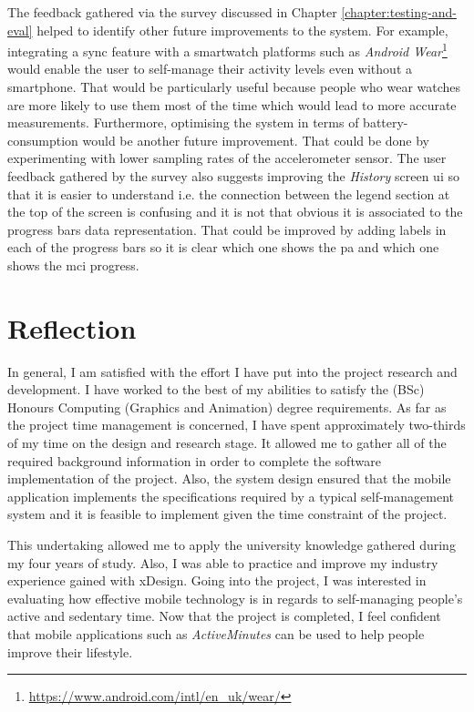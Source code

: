 The feedback gathered via the survey discussed in Chapter \ref{chapter:testing-and-eval} helped to identify other future improvements to the system. For example, integrating a sync feature with a smartwatch platforms such as \textit{Android Wear}\footnote{\url{https://www.android.com/intl/en_uk/wear/}} would enable the user to self-manage their activity levels even without a smartphone. That would be particularly useful because people who wear watches are more likely to use them most of the time which would lead to more accurate measurements. Furthermore, optimising the system in terms of battery-consumption would be another future improvement. That could be done by experimenting with lower sampling rates of the accelerometer sensor. The user feedback gathered by the survey also suggests improving the \textit{History} screen \gls{ui} so that it is easier to understand i.e. the connection between the legend section at the top of the screen is confusing and it is not that obvious it is associated to the progress bars data representation. That could be improved by adding labels in each of the progress bars so it is clear which one shows the \gls{pa} and which one shows the \gls{mci} progress.

\section{Reflection}
In general, I am satisfied with the effort I have put into the project research and development. I have worked to the best of my abilities to satisfy the (BSc) Honours Computing (Graphics and Animation) degree requirements. As far as the project time management is concerned, I have spent approximately two-thirds of my time on the design and research stage. It allowed me to gather all of the required background information in order to complete the software implementation of the project. Also, the system design ensured that the mobile application implements the specifications required by a typical self-management system and it is feasible to implement given the time constraint of the project.

This undertaking allowed me to apply the university knowledge gathered during my four years of study. Also, I was able to practice and improve my industry experience gained with xDesign. Going into the project, I was interested in evaluating how effective mobile technology is in regards to self-managing people's active and sedentary time. Now that the project is completed, I feel confident that mobile applications such as \textit{ActiveMinutes} can be used to help people improve their lifestyle.

